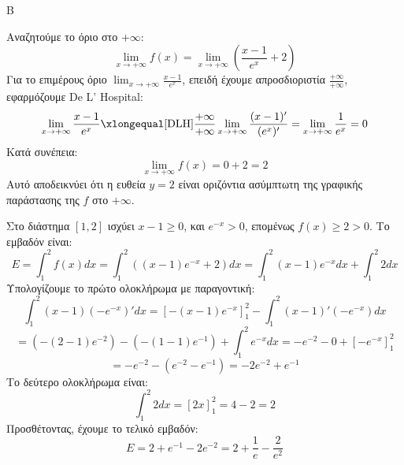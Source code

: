 \begin{thema}{Β}
\begin{erwthma}
\item Αναζητούμε το όριο στο $+\infty$:
\[ \lim_{x\to+\infty} f(x) = \lim_{x\to+\infty} \left( \frac{x-1}{e^x} + 2 \right) \]
Για το επιμέρους όριο $\lim_{x\to+\infty} \frac{x-1}{e^x}$, επειδή έχουμε απροσδιοριστία $\frac{+\infty}{+\infty}$, εφαρμόζουμε De L' Hospital:
\[ \lim_{x\to+\infty} \frac{x-1}{e^x} \xlongequal[\text{DLH}]{\frac{+\infty}{+\infty}} \lim_{x\to+\infty} \frac{(x-1)'}{(e^x)'} = \lim_{x\to+\infty} \frac{1}{e^x} = 0 \]
Κατά συνέπεια:
\[ \lim_{x\to+\infty} f(x) = 0 + 2 = 2 \]
Αυτό αποδεικνύει ότι η ευθεία $y = 2$ είναι οριζόντια ασύμπτωτη της γραφικής παράστασης της $f$ στο $+\infty$.

\item Στο διάστημα $[1, 2]$ ισχύει $x-1 \ge 0$, και $e^{-x} > 0$, επομένως $f(x) \ge 2 > 0$.
Το εμβαδόν είναι:
\[ E = \int_1^2 f(x) dx = \int_1^2 ((x-1)e^{-x} + 2) dx = \int_1^2 (x-1)e^{-x} dx + \int_1^2 2 dx \]
Υπολογίζουμε το πρώτο ολοκλήρωμα με παραγοντική:
\[ \int_1^2 (x-1)(-e^{-x})' dx = \left[ -(x-1)e^{-x} \right]_1^2 - \int_1^2 (x-1)'(-e^{-x}) dx \]
\[ = \left( -(2-1)e^{-2} \right) - \left( -(1-1)e^{-1} \right) + \int_1^2 e^{-x} dx = -e^{-2} - 0 + \left[ -e^{-x} \right]_1^2 \]
\[ = -e^{-2} - (e^{-2} - e^{-1}) = -2e^{-2} + e^{-1} \]
Το δεύτερο ολοκλήρωμα είναι:
\[ \int_1^2 2 dx = [2x]_1^2 = 4 - 2 = 2 \]
Προσθέτοντας, έχουμε το τελικό εμβαδόν:
\[ E = 2 + e^{-1} - 2e^{-2} = 2 + \frac{1}{e} - \frac{2}{e^2} \]
\end{erwthma}
\end{thema}

